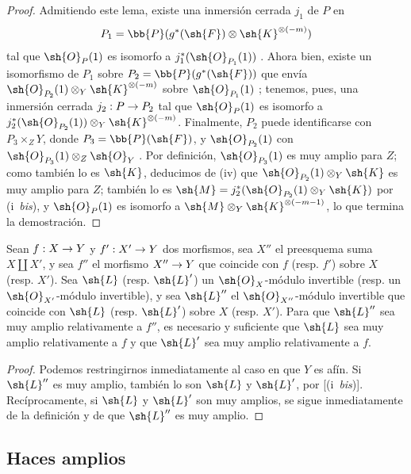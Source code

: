 \documentclass[oneside,10pt]{amsart}
\makeatletter
\newcommand{\ega@arrow}[2]{\mathchoice{#1}{#2}{#2}{#2}}
\renewcommand{\to}{\ega@arrow{\longrightarrow}{\rightarrow}}
\newcommand{\oldpage}[2][]{\marginnote{\normalfont\footnotesize\textbf{#1}~|~#2}\ignorespaces}
\let\EGAOriginalLabel\label
\renewcommand{\label}[1]{\phantomsection\EGAOriginalLabel{#1}}
\makeatother
\begin{document}
\begin{proof}
\oldpage[II]{83}
Admitiendo este lema, existe una inmersión cerrada $j_1$ de $P$ en
\[
  P_1=\bb{P}(g^*(\sh{F})\otimes\sh{K}^{\otimes(-m)})
\]
tal que $\sh{O}_P(1)$ es isomorfo a $j_1^*(\sh{O}_{P_1}(1))$ .
Ahora bien, existe un isomorfismo de $P_1$ sobre $P_2=\bb{P}(g^*(\sh{F}))$ que envía $\sh{O}_{P_2}(1)\otimes_Y\sh{K}^{\otimes(-m)}$ sobre $\sh{O}_{P_1}(1)$ ;
tenemos, pues, una inmersión cerrada $j_2:P\to P_2$ tal que $\sh{O}_P(1)$ es isomorfo a $j_2^*(\sh{O}_{P_2}(1))\otimes_Y\sh{K}^{\otimes(-m)}$.
Finalmente, $P_2$ puede identificarse con $P_3\times_ZY$, donde $P_3=\bb{P}(\sh{F})$, y $\sh{O}_{P_2}(1)$ con $\sh{O}_{P_3}(1)\otimes_Z\sh{O}_Y$ .
Por definición, $\sh{O}_{P_3}(1)$ es muy amplio para $Z$;
como también lo es $\sh{K}$, deducimos de (iv) que $\sh{O}_{P_2}(1)\otimes_Y\sh{K}$ es muy amplio para $Z$;
también lo es $\sh{M}=j_2^*(\sh{O}_{P_2}(1)\otimes_Y\sh{K})$ por (i~\emph{bis}), y $\sh{O}_P(1)$ es isomorfo a $\sh{M}\otimes_Y\sh{K}^{\otimes(-m-1)}$, lo que termina la demostración.
\end{proof}

\begin{proposition}[4.4.11]
\label{II.4.4.11}
Sean $f:X\to Y$ y $f':X'\to Y$ dos morfismos, sea $X''$ el preesquema suma $X\amalg X'$, y sea $f''$ el morfismo $X''\to Y$ que coincide con $f$ \textup{(resp. $f'$)} sobre $X$ \textup{(resp. $X'$)}.
Sea $\sh{L}$ \textup{(resp. $\sh{L}'$)} un $\sh{O}_X$-módulo invertible \textup{(resp.} un $\sh{O}_{X'}$-módulo invertible\textup{)}, y sea $\sh{L}''$ el $\sh{O}_{X''}$-módulo invertible que coincide con $\sh{L}$ (resp. $\sh{L}'$) sobre $X$ (resp. $X'$).
Para que $\sh{L}''$ sea muy amplio relativamente a $f''$, es necesario y suficiente que $\sh{L}$ sea muy amplio relativamente a $f$ y que $\sh{L}'$ sea muy amplio relativamente a $f$.
\end{proposition}

\begin{proof}
Podemos restringirnos inmediatamente al caso en que $Y$ es afín.
Si $\sh{L}''$ es muy amplio, también lo son $\sh{L}$ y $\sh{L}'$, por [(i~\emph{bis})].
Recíprocamente, si $\sh{L}$ y $\sh{L}'$ son muy amplios, se sigue inmediatamente de la definición  y de  que $\sh{L}''$ es muy amplio.
\end{proof}

\subsection{Haces amplios}
\label{subsection:II.4.5}
\end{document}
